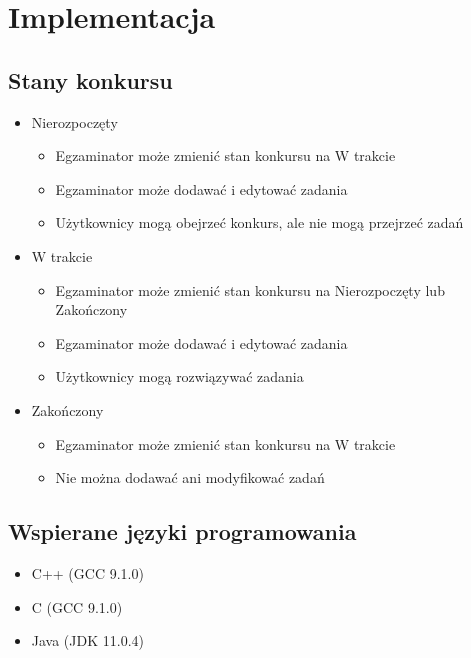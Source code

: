 \documentclass{article}
\begin{document}
\section{Implementacja}
\subsection{Stany konkursu}
\begin{itemize}
    \item Nierozpoczęty
    \begin{itemize}
        \item Egzaminator może zmienić stan konkursu na W trakcie
        \item Egzaminator może dodawać i edytować zadania
        \item Użytkownicy mogą obejrzeć konkurs, ale nie mogą przejrzeć zadań
    \end{itemize}

    \item W trakcie
    \begin{itemize}
        \item Egzaminator może zmienić stan konkursu na Nierozpoczęty lub Zakończony
        \item Egzaminator może dodawać i edytować zadania
        \item Użytkownicy mogą rozwiązywać zadania
    \end{itemize}

    \item Zakończony
    \begin{itemize}
        \item Egzaminator może zmienić stan konkursu na W trakcie
        \item Nie można dodawać ani modyfikować zadań
    \end{itemize}
\end{itemize}

\subsection{Wspierane języki programowania}
\begin{itemize}
    \item C++ (GCC 9.1.0)
    \item C (GCC 9.1.0)
    \item Java (JDK 11.0.4)
\end{itemize}
\end{document}
